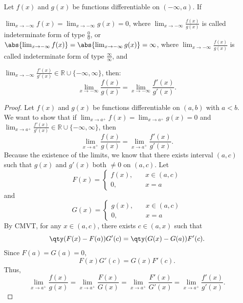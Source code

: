 Let $f(x)$ and $g(x)$ be functions differentiable on $(-\infty,a)$. If
\bit
\item $\lim_{x\to -\infty}f(x)=\lim_{x\to -\infty}g(x)=0$, where $\lim_{x\to -\infty}\frac{f(x)}{g(x)}$ is called indeterminate form of type $\frac{0}{0}$, or $\abs{\lim_{x\to -\infty}f(x)}=\abs{\lim_{x\to -\infty}g(x)}=\infty$, where $\lim_{x\to -\infty}\frac{f(x)}{g(x)}$ is called indeterminate form of type $\frac{\infty}{\infty}$, and
\item $\lim_{x\to -\infty}\frac{f'(x)}{g'(x)}\in\mathbb{R}\cup\{-\infty,\infty\}$,
\eit
then:
\[\lim_{x\to -\infty}\frac{f(x)}{g(x)}=\lim_{x\to -\infty}\frac{f'(x)}{g'(x)}.\]
\begin{proof}
Let $f(x)$ and $g(x)$ be functions differentiable on $(a,b)$ with $a<b$. We want to show that if $\lim_{x\to a^+}f(x)=\lim_{x\to a^+}g(x)=0$ and $\lim_{x\to a^+}\frac{f'(x)}{g'(x)}\in\mathbb{R}\cup\{-\infty,\infty\}$, then
\[\lim_{x\to a^+}\frac{f(x)}{g(x)}=\lim_{x\to a^+}\frac{f'(x)}{g'(x)}.\]
Because the existence of the limits, we know that there exists interval $(a,c)$ such that $g(x)$ and $g'(x)$ both $\neq 0$ on $(a,c)$. Let
\[F(x)=\begin{cases}f(x),\quad & x\in (a,c)\\
0,\quad & x=a\end{cases}\]
and
\[G(x)=\begin{cases}g(x),\quad & x\in (a,c)\\
0,\quad & x=a\end{cases}\]
By CMVT, for any $x\in (a,c)$, there exists $c\in (a,x)$ such that
\[\qty(F(x)-F(a))G'(c)=\qty(G(x)-G(a))F'(c).\]
Since $F(a)=G(a)=0$,
\[F(x)G'(c)=G(x)F'(c).\]
Thus,
\[\lim_{x\to a^+}\frac{f(x)}{g(x)}=\lim_{x\to a^+}\frac{F(x)}{G(x)}=\lim_{x\to a^+}\frac{F'(x)}{G'(x)}=\lim_{x\to a^+}\frac{f'(x)}{g'(x)}.\]


\end{proof}
